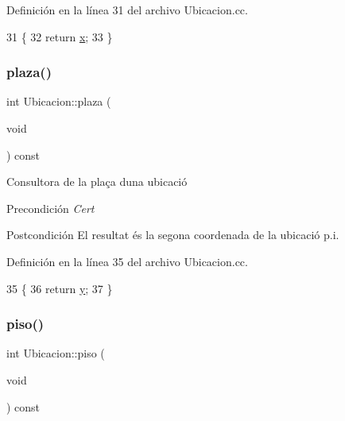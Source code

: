 Definición en la línea 31 del archivo Ubicacion.\+cc.


\begin{DoxyCode}
31                                 \{
32   \textcolor{keywordflow}{return} \hyperlink{class_ubicacion_aa025967df0ca8761587b09a38cf5b798}{x};
33 \}
\end{DoxyCode}
\mbox{\label{class_ubicacion_abed323ffb2eace375e80bc395fdaeb39}} 
\subsubsection{\texorpdfstring{plaza()}{plaza()}}
{\footnotesize\ttfamily int Ubicacion\+::plaza (\begin{DoxyParamCaption}\item[{void}]{ }\end{DoxyParamCaption}) const}



Consultora de la plaça d\textquotesingle{}una ubicació 

\begin{DoxyPrecond}{Precondición}
{\itshape Cert} 
\end{DoxyPrecond}
\begin{DoxyPostcond}{Postcondición}
El resultat és la segona coordenada de la ubicació p.\+i. 
\end{DoxyPostcond}


Definición en la línea 35 del archivo Ubicacion.\+cc.


\begin{DoxyCode}
35                                \{
36   \textcolor{keywordflow}{return} \hyperlink{class_ubicacion_ab314f05b8da651aabb8a623467919a94}{y};
37 \}
\end{DoxyCode}
\mbox{\label{class_ubicacion_af6099f8de4dee993e4c9119e1f879070}} 
\subsubsection{\texorpdfstring{piso()}{piso()}}
{\footnotesize\ttfamily int Ubicacion\+::piso (\begin{DoxyParamCaption}\item[{void}]{ }\end{DoxyParamCaption}) const}



